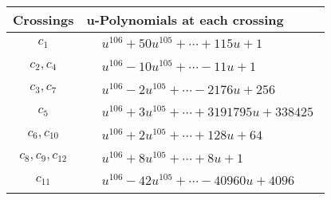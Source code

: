 \documentclass[1p]{elsarticle_modified}
\theoremstyle{definition}
\begin{document}
\begin{tabular}{m{50pt}|m{274pt}}
Crossings & \hspace{64pt}u-Polynomials at each crossing \\
\hline $$\begin{aligned}c_{1}\end{aligned}$$&$\begin{aligned}
&u^{106}+50 u^{105}+\cdots+115 u+1
\end{aligned}$\\
\hline $$\begin{aligned}c_{2},c_{4}\end{aligned}$$&$\begin{aligned}
&u^{106}-10 u^{105}+\cdots-11 u+1
\end{aligned}$\\
\hline $$\begin{aligned}c_{3},c_{7}\end{aligned}$$&$\begin{aligned}
&u^{106}-2 u^{105}+\cdots-2176 u+256
\end{aligned}$\\
\hline $$\begin{aligned}c_{5}\end{aligned}$$&$\begin{aligned}
&u^{106}+3 u^{105}+\cdots+3191795 u+338425
\end{aligned}$\\
\hline $$\begin{aligned}c_{6},c_{10}\end{aligned}$$&$\begin{aligned}
&u^{106}+2 u^{105}+\cdots+128 u+64
\end{aligned}$\\
\hline $$\begin{aligned}c_{8},c_{9},c_{12}\end{aligned}$$&$\begin{aligned}
&u^{106}+8 u^{105}+\cdots+8 u+1
\end{aligned}$\\
\hline $$\begin{aligned}c_{11}\end{aligned}$$&$\begin{aligned}
&u^{106}-42 u^{105}+\cdots-40960 u+4096
\end{aligned}$\\
\hline
\end{tabular}\\~\\
\end{document}
